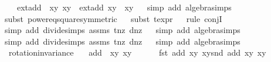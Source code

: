 \begin{isabellebody}
\ \ \ {\isachardoublequoteopen}ext{\isacharunderscore}add\ {\isacharparenleft}{\isasymtau}\ {\isacharparenleft}x{}{\isacharcomma}y{}{\isacharparenright}{\isacharparenright}\ {\isacharparenleft}x{}{\isacharcomma}y{}{\isacharparenright}\ {\isacharequal}\ ext{\isacharunderscore}add\ {\isacharparenleft}x{}{\isacharcomma}y{}{\isacharparenright}\ {\isacharparenleft}{\isasymtau}\ {\isacharparenleft}x{}{\isacharcomma}y{}{\isacharparenright}{\isacharparenright}{\isachardoublequoteclose}\isanewline
%
\isadelimproof
\ \ %
\endisadelimproof
%
\isatagproof
{}\isamarkupfalse%
{\isacharparenleft}simp\ add{\isacharcolon}\ algebra{\isacharunderscore}simps{\isacharparenright}\isanewline
\ \ \isamarkupfalse%
{\isacharparenleft}subst\ power{}{\isacharunderscore}eq{\isacharunderscore}square{\isacharbrackleft}symmetric{\isacharbrackright}{\isacharparenright}{\isacharplus}\isanewline
\ \ \isamarkupfalse%
{\isacharparenleft}subst\ t{\isacharunderscore}expr{\isacharparenright}{\isacharplus}\isanewline
\ \ \isamarkupfalse%
{\isacharparenleft}rule\ conjI{\isacharparenright}\isanewline
\ \ \isamarkupfalse%
{\isacharparenleft}simp\ add{\isacharcolon}\ divide{\isacharunderscore}simps\ assms\ t{\isacharunderscore}nz\ d{\isacharunderscore}nz{\isacharparenright}\isanewline
\ \ \isamarkupfalse%
{\isacharparenleft}simp\ add{\isacharcolon}\ algebra{\isacharunderscore}simps{\isacharparenright}\isanewline
\ \ \isamarkupfalse%
{\isacharparenleft}simp\ add{\isacharcolon}\ divide{\isacharunderscore}simps\ assms\ t{\isacharunderscore}nz\ d{\isacharunderscore}nz{\isacharparenright}\isanewline
\ \ \isamarkupfalse%
{\isacharparenleft}simp\ add{\isacharcolon}\ algebra{\isacharunderscore}simps{\isacharparenright}%
\endisatagproof
{\isafoldproof}%
%
\isadelimproof
\isanewline
%
\endisadelimproof
\isanewline
{}\isamarkupfalse%
\ rotation{\isacharunderscore}invariance{\isacharunderscore}{}{\isacharcolon}\ \isanewline
\ \ {\isachardoublequoteopen}add\ {\isacharparenleft}{\isasymrho}\ {\isacharparenleft}x{}{\isacharcomma}y{}{\isacharparenright}{\isacharparenright}\ {\isacharparenleft}x{}{\isacharcomma}y{}{\isacharparenright}\ {\isacharequal}\ \isanewline
\ \ \ {\isasymrho}\ {\isacharparenleft}fst\ {\isacharparenleft}add\ {\isacharparenleft}x{}{\isacharcomma}y{}{\isacharparenright}\ {\isacharparenleft}x{}{\isacharcomma}y{}{\isacharparenright}{\isacharparenright}{\isacharcomma}snd\ {\isacharparenleft}add\ {\isacharparenleft}x{}{\isacharcomma}y{}{\isacharparenright}\ {\isacharparenleft}x{}{\isacharcomma}y{}{\isacharparenright}{\isacharparenright}{\isacharparenright}{\isachardoublequoteclose}\isanewline

\end{isabellebody}
